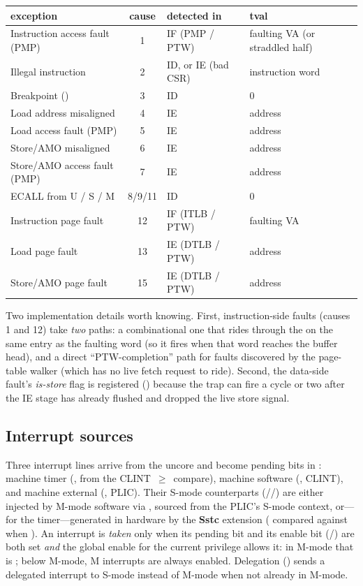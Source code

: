 \begin{center}\small
\begin{tabularx}{\textwidth}{l c l Y}
\toprule
\textbf{exception} & \textbf{cause} & \textbf{detected in} & \textbf{tval} \\
\midrule
Instruction access fault (PMP) & 1  & IF (PMP / PTW) & faulting VA (or straddled half) \\
Illegal instruction            & 2  & ID, or IE (bad CSR) & instruction word \\
Breakpoint ()       & 3  & ID & 0 \\
Load address misaligned        & 4  & IE & address \\
Load access fault (PMP)        & 5  & IE & address \\
Store/AMO misaligned           & 6  & IE & address \\
Store/AMO access fault (PMP)   & 7  & IE & address \\
ECALL from U / S / M           & 8/9/11 & ID & 0 \\
Instruction page fault         & 12 & IF (ITLB / PTW) & faulting VA \\
Load page fault                & 13 & IE (DTLB / PTW) & address \\
Store/AMO page fault           & 15 & IE (DTLB / PTW) & address \\
\bottomrule
\end{tabularx}
\end{center}

Two implementation details worth knowing. First, instruction-side faults
(causes 1 and 12) take \emph{two} paths: a combinational one that rides through
the  on the same entry as the faulting word (so it fires when
that word reaches the buffer head), and a direct ``PTW-completion'' path for
faults discovered by the page-table walker (which has no live fetch request to
ride). Second, the data-side fault's \emph{is-store} flag is registered
() because the trap can fire a cycle or two after the IE
stage has already flushed and dropped the live store signal.

\subsection{Interrupt sources}
Three interrupt lines arrive from the uncore and become pending bits in
: machine timer (, from the CLINT \,$\ge$\,
compare), machine software (, CLINT), and machine external (,
PLIC). Their S-mode counterparts (//) are either
injected by M-mode software via , sourced from the PLIC's S-mode
context, or---for the timer---generated in hardware by the \textbf{Sstc}
extension ( compared against  when ).
An interrupt is \emph{taken} only when its pending bit and its enable bit
(/) are both set \emph{and} the global enable for the current
privilege allows it: in M-mode that is ; below M-mode, M
interrupts are always enabled. Delegation () sends a delegated
interrupt to S-mode instead of M-mode when not already in M-mode.

